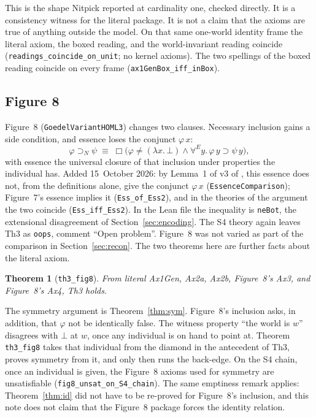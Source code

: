 \documentclass[11pt,a4paper]{article}
\newcommand{\Nec}{\Box}
\newcommand{\allE}{\forall^{E}}
\newcommand{\necImp}{\supset_{N}}
\newcommand{\lean}[1]{\texttt{#1}}
\newtheorem{theorem}{Theorem}
\theoremstyle{definition}
\theoremstyle{remark}
\begin{document}
This is the shape Nitpick reported at cardinality one, checked directly.
It is a consistency witness for the literal package.
It is not a claim that the axioms are true of anything outside the model.
On that same one-world identity frame the literal axiom, the boxed reading,
and the world-invariant reading coincide
(\lean{readings\_coincide\_on\_unit}; no kernel axioms).
The two spellings of the boxed reading coincide on every frame
(\lean{ax1GenBox\_iff\_inBox}).

\subsection{Figure 8}

Figure~8 (\lean{GoedelVariantHOML3}) changes two clauses.
Necessary inclusion gains a side condition, and essence loses the conjunct
\(\varphi\,x\):
\[
  \varphi \necImp \psi
    \;\equiv\;
    \Nec\bigl(\varphi \neq (\lambda x.\,\bot)
      \land \allE y.\, \varphi\,y \supset \psi\,y\bigr),
\]
with essence the universal closure of that inclusion under properties the
individual has.
Added 15~October 2026: by Lemma~1 of v3 of \cite{benzmuellerPWN2026}, this
essence does not, from the definitions alone, give the conjunct
\(\varphi\,x\) (\lean{EssenceComparison}); Figure~7's essence implies it
(\lean{Ess\_of\_Ess2}), and in the theories of the argument the two coincide
(\lean{Ess\_iff\_Ess2}).
In the Lean file the inequality is \lean{neBot}, the extensional disagreement
of Section~\ref{sec:encoding}.
The S4 theory again leaves Th3 as \lean{oops}, comment ``Open problem''.
Figure~8 was not varied as part of the comparison in Section~\ref{sec:recon}.
The two theorems here are further facts about the literal axiom.

\begin{theorem}[\lean{th3\_fig8}]
\label{thm:fig8}
From literal Ax1Gen, Ax2a, Ax2b, Figure~8's Ax3, and Figure~8's Ax4, Th3 holds.
\end{theorem}

The symmetry argument is Theorem~\ref{thm:sym}.
Figure~8's inclusion asks, in addition, that \(\varphi\) not be identically
false.
The witness property ``the world is \(w\)'' disagrees with \(\bot\) at \(w\),
once any individual is on hand to point at.
Theorem \lean{th3\_fig8} takes that individual from the diamond in the
antecedent of Th3, proves symmetry from it, and only then runs the back-edge.
On the S4 chain, once an individual is given, the Figure~8 axioms used for
symmetry are unsatisfiable (\lean{fig8\_unsat\_on\_S4\_chain}).
The same emptiness remark applies: Theorem~\ref{thm:id} did not have to be
re-proved for Figure~8's inclusion, and this note does not claim that the
Figure~8 package forces the identity relation.
\end{document}

